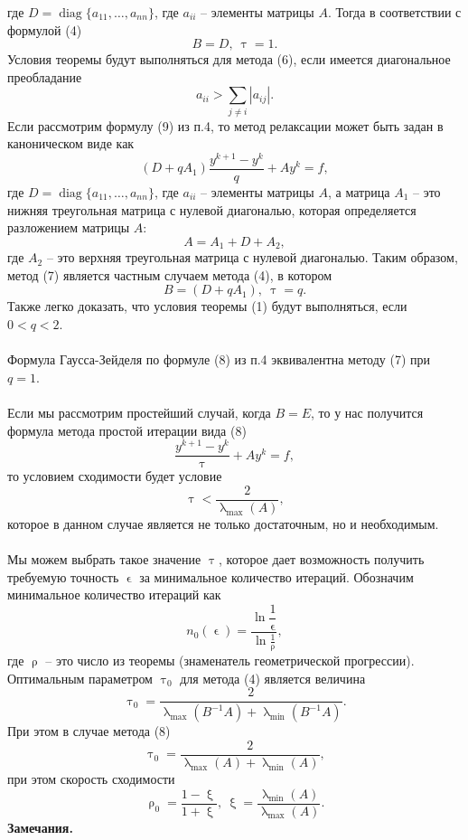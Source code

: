 \documentclass[a4paper, 12pt]{report}
\numberwithin{equation}{section}
\renewcommand{\tau}{\uptau}
\renewcommand{\lambda}{\uplambda}
\renewcommand{\xi}{\upxi}
\renewcommand{\epsilon}{\upvarepsilon}
\renewcommand{\rho}{\uprho}
\begin{document}
	где $D = \operatorname{diag}\{a_{11},\ldots, a_{nn}\}$, где $a_{ii}$ -- элементы матрицы $A$. Тогда  в соответствии с формулой (4) $$B = D,\ \tau = 1.$$
	Условия теоремы будут выполняться для метода (6), если имеется диагональное преобладание $$a_{ii} > \sum_{j\ne i} |a_{ij}|.$$
	Если рассмотрим формулу (9) из п.4, то метод релаксации может быть задан в каноническом виде как
	\begin{equation}
		(D + q A_1)\dfrac{y^{k+1} - y^k}{q} + A y^k = f,
	\end{equation}
	где $D = \operatorname{diag}\{a_{11},\ldots, a_{nn}\}$, где $a_{ii}$ -- элементы матрицы $A$, а матрица $A_1$ -- это нижняя треугольная матрица с нулевой диагональю, которая определяется разложением матрицы $A$:
	$$A = A_1 + D + A_2,$$
	где $A_2$ -- это верхняя треугольная матрица с нулевой диагональю. Таким образом, метод (7) является частным случаем метода (4), в котором
	$$B = (D+qA_1),\ \tau = q.$$
	Также легко доказать, что условия теоремы (1) будут выполняться, если $0<q<2$.\\\\
	Формула Гаусса-Зейделя по формуле (8) из п.4 эквивалентна методу (7) при $q=1$.\\\\
	Если мы рассмотрим простейший случай, когда $B=E$, то у нас получится формула метода простой итерации вида (8)
	\begin{equation}
		\dfrac{y^{k+1} - y^k}{\tau} + A y^k = f,
	\end{equation}
	то условием сходимости будет условие
	$$\tau < \dfrac{2}{\lambda_{\max}(A)},$$
	которое в данном случае является не только достаточным, но и необходимым.\\\\
	Мы можем выбрать такое значение $\tau$, которое дает возможность получить требуемую точность $\epsilon$ за минимальное количество итераций. Обозначим минимальное количество итераций как
	$$n_0(\epsilon) = \dfrac{\ln \dfrac 1 \epsilon}{\ln \frac 1 \rho},$$
	где $\rho$ -- это число из теоремы (знаменатель геометрической прогрессии). Оптимальным параметром $\tau_0$ для метода (4) является величина
	$$\tau_0 = \dfrac{2}{\lambda_{\max} (B^{-1}A) + \lambda_{\min}(B^{-1}A)}.$$
	При этом в случае метода (8) $$\tau_0 = \dfrac{2}{\lambda_{\max}(A) + \lambda_{\min}(A)},$$
	при этом скорость сходимости
	$$\rho_0 = \dfrac{1 - \xi}{1 + \xi},
	\ \xi = \dfrac{\lambda_{\min}(A)}{\lambda_{\max}(A)}.$$
	\textbf{Замечания.}
\end{document}
